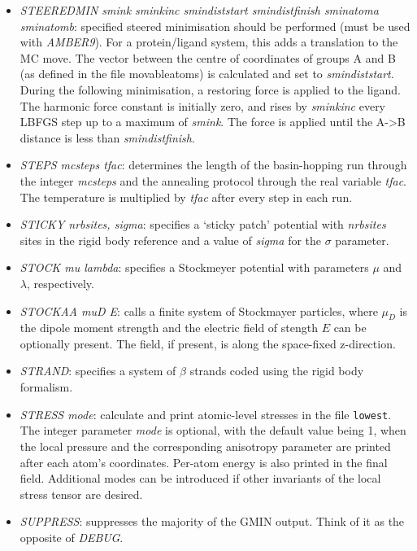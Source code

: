 \documentclass[12pt,a4paper,dvips]{article}
\begin{document}
\begin{itemize}
\item {\it STEEREDMIN smink sminkinc smindiststart smindistfinish sminatoma sminatomb\/}: specified steered 
minimisation should be performed (must be used with {\it AMBER9}). For a protein/ligand system, this adds a translation
to the MC move. The vector between the centre of coordinates of groups A and B (as defined in the file movableatoms)
is calculated and set to {\it smindiststart}. During the following minimisation, a restoring force is applied to 
the ligand. The harmonic force constant is initially zero, and rises by {\it sminkinc} every LBFGS step up to a
maximum of {\it smink}. The force is applied until the A-\textgreater B distance is less than {\it smindistfinish}.  

\item {\it STEPS mcsteps tfac\/}: determines the length of the
basin-hopping run through the integer {\it mcsteps\/} and the annealing protocol through
the real variable {\it tfac\/}. The temperature is multiplied by {\it tfac\/}
after every step in each run. 

\item {\it STICKY nrbsites, sigma\/}: specifies a `sticky patch' potential with {\it nrbsites}
sites in the rigid body reference and a value of {\it sigma} for the $\sigma$ parameter.

\item {\it STOCK mu lambda}: specifies a Stockmeyer potential with parameters
$\mu$ and $\lambda$, respectively.

\item {\it STOCKAA muD E\/}: calls a finite system of Stockmayer particles,
where $\mu_{D}$ is the dipole moment strength and the electric field of stength $E$ can be optionally present. The field, if
present, is along the space-fixed z-direction.

\item {\it STRAND}: specifies a system of $\beta$ strands coded using the rigid body formalism.

\item {\it STRESS mode}: calculate and print atomic-level stresses in the file {\tt lowest\/}. The integer parameter {\it mode} is optional, with the default value being 1, when the local pressure and the corresponding anisotropy parameter are printed after each atom's coordinates. Per-atom energy is also printed in the final field. Additional modes can be introduced if other invariants of the local stress tensor are desired.

\item {\it SUPPRESS}: suppresses the majority of the GMIN output.
Think of it as the opposite of {\it DEBUG}.


\end{itemize}
\end{document}
